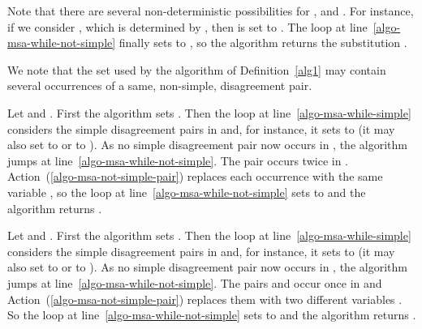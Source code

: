 \documentclass[fleqn]{tlp}
\begin{document}
\begin{appendix}
\begin{example}
  Note that there are several non-deterministic possibilities
  for ,  and . For instance, if we
  consider , which is determined by ,
  then  is set to .
  The loop at line~\ref{algo-msa-while-not-simple} finally sets 
   to , so the algorithm returns the substitution
  .
\end{example}
We note that the set  used by the algorithm
of Definition~\ref{alg1} may contain several occurrences
of a same, non-simple, disagreement pair.

\begin{example}
  Let  and .
  First the algorithm sets .
  Then the loop at line~\ref{algo-msa-while-simple}
  considers the simple disagreement pairs in  and,
  for instance, it sets  to 
  (it may also set  to 
  or to ).
  As no simple disagreement pair now occurs in , the
  algorithm jumps at line~\ref{algo-msa-while-not-simple}.
  The pair  occurs twice in .
  Action~(\ref{algo-msa-not-simple-pair}) replaces each occurrence
  with the same variable , so the loop at
  line~\ref{algo-msa-while-not-simple} sets
   to  and the algorithm returns .
\end{example}

\begin{example}
  Let  and .
  First the algorithm sets .
  Then the loop at line~\ref{algo-msa-while-simple}
  considers the simple disagreement pairs in  and,
  for instance, it sets  to 
  (it may also set  to 
  or to ).
  As no simple disagreement pair now occurs in , the
  algorithm jumps at line~\ref{algo-msa-while-not-simple}.
  The pairs  and  occur once in  and
  Action~(\ref{algo-msa-not-simple-pair}) replaces them with
  two different variables .
  So the loop at line~\ref{algo-msa-while-not-simple} sets
   to  and the algorithm returns .
\end{example}

\end{appendix}
\end{document}
